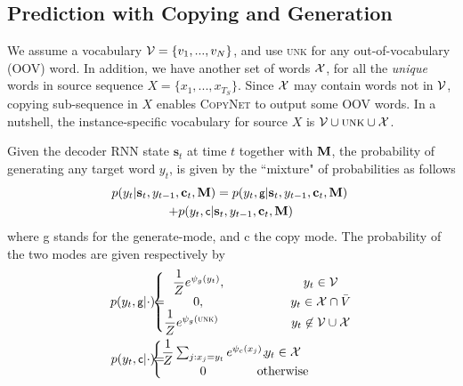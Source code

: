 \subsection{Prediction with Copying and Generation}
\label{sec:predict}
We assume a vocabulary $\mathcal{V}=\{v_1, ..., v_N\}$, and use \textsc{unk} for any out-of-vocabulary (OOV) word. 
In addition, we have another set of words $\mathcal{X}$, for all the 
\emph{unique} words in source sequence $X=\{x_1, ..., x_{T_S}\}$.
Since $\mathcal{X}$ may contain words not in $\mathcal{V}$, copying sub-sequence in $X$ enables \textsc{CopyNet} to output some OOV words. In a nutshell, the instance-specific vocabulary for source $X$ is $\mathcal{V} \cup \textsc{unk} \cup \mathcal{X}$.

Given the decoder RNN state $\mathbf{s}_t$ at time $t$ together with $\mathbf{M}$,      
the probability of generating any target word $y_t$,  is given by the ``mixture" of probabilities as follows
\begin{multline}
\hspace{-2pt}	p(y_t|\mathbf{s}_t, y_{t-1}, \mathbf{c}_t, \mathbf{M}) = p(y_t, \textsf{\small g} | \mathbf{s}_t, y_{t-1}, \mathbf{c}_t, \mathbf{M})\\ + p(y_t, \textsf{\small c}|\mathbf{s}_t, y_{t-1}, \mathbf{c}_t,\mathbf{M}) \label{eq:mix}
\end{multline}
where \textsf{\small g} stands for the generate-mode, and \textsf{\small c} the copy mode. The probability of the two modes 
are given respectively by
\begin{eqnarray} %
\label{eq:pg}
p(y_t, \textsf{\small g}|\cdot) 
\hspace{-3pt } 
=&
\hspace{-11pt} 
 \left \{\begin{matrix}
\dfrac{1}{Z}e^{\psi_g(y_t)},                       \;\;\; \qquad& \;\;\; y_t \in \calV \\
0,                                                                          \;\;\; \qquad&\;\;\; y_t \in \calX \cap \bar{V}\\
\dfrac{1}{Z}e^{\psi_g(\textsc{unk})} \;\;\;\;     \;\;\; \qquad& \;\;\; y_t \not \in \calV \cup \calX     \\
\end{matrix}\right. \\
\label{eq:pc}
	p(y_t, \textsf{\small c}|\cdot)
	\hspace{-3pt } 
	=& 
	\hspace{-12pt} 
	\left \{\begin{matrix}
\dfrac{1}{Z}\sum_{j:x_j=y_t} e^{\psi_c(x_j)},  \hspace{-17pt} &y_t \in \calX \\
0 &\text{otherwise} 
\end{matrix}\right. 
\end{eqnarray}
